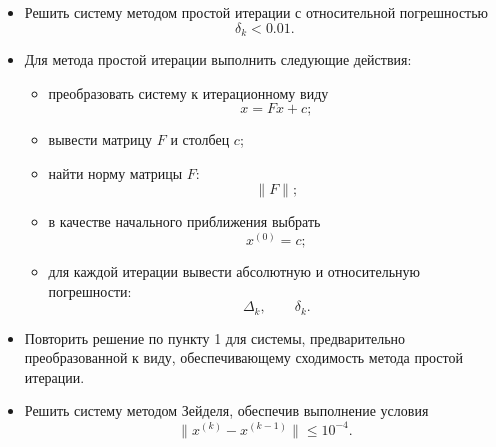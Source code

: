 \begin{itemize}
    \item Решить систему методом простой итерации с относительной погрешностью
    \[
        \delta_k < 0.01.
    \]

    \item Для метода простой итерации выполнить следующие действия:
    \begin{itemize}
        \item преобразовать систему к итерационному виду
        \[
            x = Fx + c;
        \]
        \item вывести матрицу $F$ и столбец $c$;
        \item найти норму матрицы $F$:
        \[
            \|F\|;
        \]
        \item в качестве начального приближения выбрать
        \[
            x^{(0)} = c;
        \]
        \item для каждой итерации вывести абсолютную и относительную погрешности:
        \[
            \Delta_k, \qquad \delta_k.
        \]
    \end{itemize}

    \item Повторить решение по пункту 1 для системы, предварительно преобразованной к виду, обеспечивающему сходимость метода простой итерации.

    \item Решить систему методом Зейделя, обеспечив выполнение условия
    \[
        \|x^{(k)} - x^{(k-1)}\| \leq 10^{-4}.
    \]
\end{itemize}